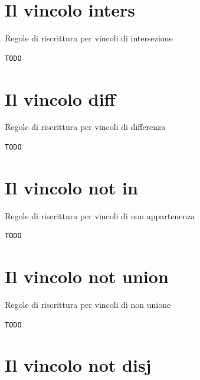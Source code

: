 \documentclass[12pt,a4paper,openright]{book} %
\begin{document}
\section{Il vincolo inters}

\begin{algorithm}[H]
	\caption{Regole di riscrittura per vincoli di intersezione}
	\label{alg:inters_constraints}
\end{algorithm}
\begin{verbatim}
TODO
\end{verbatim}

\section{Il vincolo diff}

\begin{algorithm}[H]
	\caption{Regole di riscrittura per vincoli di differenza}
	\label{alg:diff_constraints}
\end{algorithm}
\begin{verbatim}
TODO
\end{verbatim}

\section{Il vincolo not in}

\begin{algorithm}[H]
	\caption{Regole di riscrittura per vincoli di non appartenenza}
	\label{alg:notin_constraints}
\end{algorithm}
\begin{verbatim}
TODO
\end{verbatim}

\section{Il vincolo not union}

\begin{algorithm}[H]
	\caption{Regole di riscrittura per vincoli di non unione}
	\label{alg:notun_constraints}
\end{algorithm}
\begin{verbatim}
TODO
\end{verbatim}

\section{Il vincolo not disj}
\end{document}
